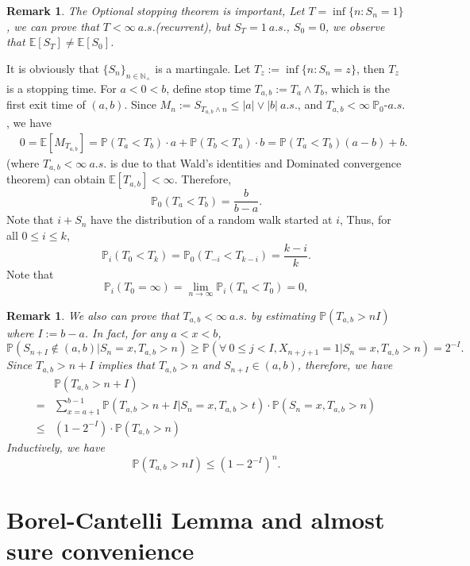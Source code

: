 \documentclass[11pt]{article}
\newtheorem{remark}[theorem]{Remark}
\theoremstyle{definition}
\newcommand{\abs}[1]{\left\vert#1\right\vert}
\begin{document}
\begin{remark}
  The Optional stopping theorem is important, Let $T=\inf\{n: S_n=1  \}$, we can prove that $T<\infty\  a.s. $(recurrent), but $S_T=1\ a.s. $, $S_0=0$, we observe that $\mathbb{E}[S_T]\neq \mathbb{E}[S_0]$.
\end{remark}
It is obviously that $\{S_n\}_{n\in \mathbb{N}_+}$ is a martingale. Let $T_z:= \inf\{ n:S_n=z \}$, then $T_z$ is a stopping time. For $a<0<b$, define stop time $T_{a,b}:=T_a\wedge T_b$, which is the first exit time of $(a,b)$. Since $M_n:= S_{T_{a,b}\wedge n} \le \abs{a}\vee \abs{b}\ a.s.$, and {\color{red} $T_{a,b}<\infty\ \mathbb{P}_0\text{-}a.s.$}, we have
\begin{equation*}
  \begin{aligned}
     & 0=\mathbb{E}[M_{T_{a,b}}]=\mathbb{P}(T_a<T_b)\cdot a + \mathbb{P}(T_b<T_a)\cdot b =\mathbb{P}(T_a<T_b)(a-b) +b.
  \end{aligned}
\end{equation*}
{\color{red} (where $T_{a,b}<\infty \ a.s.$ is due to that Wald's identities and Dominated convergence theorem)} can obtain $\mathbb{E}[T_{a,b}]<\infty$.  Therefore, 
\[
\mathbb{P}_0(T_a<T_b)=\frac{b}{b-a}.
\]
Note that $i+S_n$  have the distribution of a random walk started at $i$, Thus, for all $0\le i\le k$, 
\[
\mathbb{P}_i(T_0<T_k)=\mathbb{P}_0(T_{-i}<T_{k-i})=\frac{k-i}{k}.
\]
Note that 
\[
\mathbb{P}_i(T_0=\infty)=\lim_{n\rightarrow \infty}\mathbb{P}_i(T_n<T_0)=0,
\]
\begin{remark}
  We also can prove that $T_{a,b}<\infty\ a.s.$ by estimating $\mathbb{P}(T_{a,b}>n I)$ where $I:=b-a$.
In fact, for any $a<x<b$,
\[
\mathbb{P}(S_{n+I}\notin (a,b) |S_n=x,T_{a,b}>n)\ge \mathbb{P}(\forall \ 0\le j<I, X_{n+j+1}=1| S_n=x,T_{a,b}>n)=2^{-I}.
\]
Since $T_{a,b}>n+I$ implies that $T_{a,b}>n$ and $S_{n+I}\in (a,b)$, therefore, we have 
\begin{equation*}
  \begin{aligned}
     & \mathbb{P}(T_{a,b}>n+I)\\
=&\sum^{b-1}_{x=a+1} \mathbb{P}(T_{a,b}>n+I| S_n=x, T_{a,b}>t)\cdot \mathbb{P}(S_n=x,T_{a,b}>n)\\
\le& (1-2^{-I})\cdot \mathbb{P}(T_{a,b}>n)
  \end{aligned}
\end{equation*}
Inductively, we have
\[
\mathbb{P}(T_{a,b}>nI)\le (1-2^{-I})^n.
\]
\end{remark}
\section{Borel-Cantelli Lemma and almost sure convenience}
\end{document}
